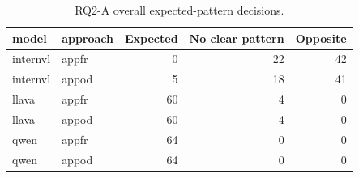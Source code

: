 \begin{table}[tbp]
\caption{RQ2-A overall expected-pattern decisions.}
\label{tab:rq2a-expected-pattern-summary-overall}
\begin{tabular}{llrrr}
\toprule
model & approach & Expected & No clear pattern & Opposite \\
\midrule
internvl & appfr & 0 & 22 & 42 \\
internvl & appod & 5 & 18 & 41 \\
llava & appfr & 60 & 4 & 0 \\
llava & appod & 60 & 4 & 0 \\
qwen & appfr & 64 & 0 & 0 \\
qwen & appod & 64 & 0 & 0 \\
\bottomrule
\end{tabular}
\end{table}
